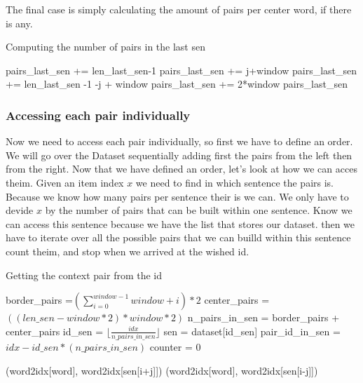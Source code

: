The final case is simply calculating the amount of pairs per center word, if there is any. 
\begin{algorithm}
\caption{Computing the number of pairs in the last sen}
\label{alg2}
\begin{algorithmic}[1]
\STATE pairs\_last\_sen += len\_last\_sen-1
\ELSE
\STATE pairs\_last\_sen += j+window
\ENDIF
{}
\STATE pairs\_last\_sen += len\_last\_sen -1 -j + window
\ELSE
\STATE pairs\_last\_sen += 2*window
\ENDIF
\ENDFOR
\RETURN pairs\_last\_sen
\end{algorithmic}
\end{algorithm}
 
 \subsubsection{Accessing each pair individually}
Now we need to access each pair individually, so first we have to define an order. We will go over the Dataset sequentially adding first the pairs from the left then from the right. Now that we have defined an order, let's look at how we can acces theim. Given an item index $x$ we need to find in which sentence the pairs is. Because we know how many pairs per sentence their is we can. We only have to devide $x$ by the number of pairs that can be built within one sentence. Know we can access this sentence because we have the list that stores our dataset. then we have to iterate over all the possible pairs that we can builld within this sentence count theim, and stop when we arrived at the wished id. 

\begin{algorithm}
\caption{Getting the context pair from the id}
\label{alg1}
\begin{algorithmic}[1]
 \STATE border\_pairs =$(\sum_{i=0}^{window -1} window + i)*2$
        \STATE center\_pairs =$ ((len\_sen - window*2)*window*2)$
        \STATE n\_pairs\_in\_sen = border\_pairs + center\_pairs
        \STATE id\_sen = $\lfloor \frac{idx}{n\_pairs\_in\_sen} \rfloor$
		\STATE         sen  = dataset[id\_sen]
       \STATE  pair\_id\_in\_sen = $idx - id\_sen*(n\_pairs\_in\_sen)$
        \STATE counter = 0

\RETURN (word2idx[word], word2idx[sen[i+j]])
\ENDIF
\ENDIF
{}
\RETURN (word2idx[word], word2idx[sen[i-j]])
\ENDIF
\ENDIF
\ENDFOR
\ENDFOR
\end{algorithmic}
\end{algorithm}

